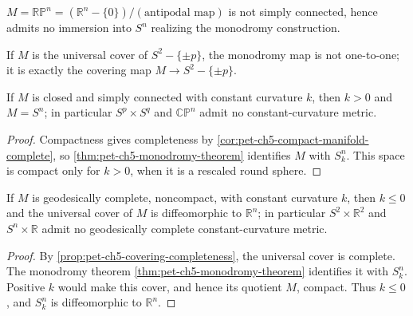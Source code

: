 \begin{example}
  \label{ex:pet-ch5-rp-n-no-immersion}
  $M=\mathbb{RP}^n=(\mathbb R^n-\{0\})/(\text{antipodal map})$ is not simply
  connected, hence admits no immersion into $S^n$ realizing the monodromy
  construction.
\end{example}

\begin{example}
  \label{ex:pet-ch5-universal-cover-monodromy}
  If $M$ is the universal cover of $S^2-\{\pm p\}$, the monodromy map is not
  one-to-one; it is exactly the covering map $M\to S^2-\{\pm p\}$.
\end{example}

\begin{corollary}
  \label{cor:pet-ch5-closed-simply-connected-constant-curvature}
  If $M$ is closed and simply connected with constant curvature $k$, then $k>0$
  and $M=S^n$; in particular $S^p\times S^q$ and $\mathbb{CP}^n$ admit no
  constant-curvature metric.
\end{corollary}
\begin{proof}
  \sketch
  Compactness gives completeness by \cref{cor:pet-ch5-compact-manifold-complete},
  so \cref{thm:pet-ch5-monodromy-theorem} identifies $M$ with $S_k^n$.  This space
  is compact only for $k>0$, when it is a rescaled round sphere.
\end{proof}

\begin{corollary}
  \label{cor:pet-ch5-noncompact-constant-curvature}
  If $M$ is geodesically complete, noncompact, with constant curvature $k$, then
  $k\le0$ and the universal cover of $M$ is diffeomorphic to $\mathbb R^n$; in
  particular $S^2\times\mathbb R^2$ and $S^n\times\mathbb R$ admit no geodesically
  complete constant-curvature metric.
\end{corollary}
\begin{proof}
  \sketch
  By \cref{prop:pet-ch5-covering-completeness}, the universal cover is complete.
  The monodromy theorem \cref{thm:pet-ch5-monodromy-theorem} identifies it with
  $S_k^n$.  Positive $k$ would make this cover, and hence its quotient $M$, compact.
  Thus $k\le0$, and $S_k^n$ is diffeomorphic to $\mathbb R^n$.
\end{proof}

